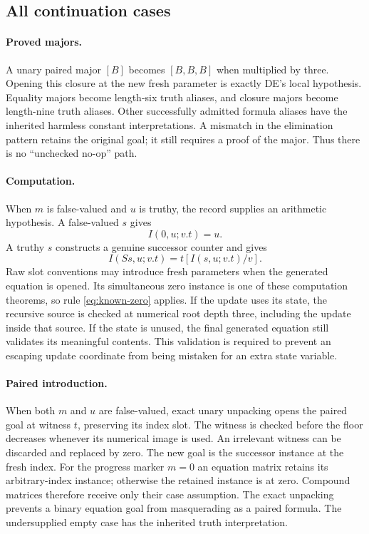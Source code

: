 \subsection{All continuation cases}

\paragraph{Proved majors.}
A unary paired major $[B]$ becomes $[B,B,B]$ when multiplied by three.
Opening this closure at the new fresh parameter is exactly DE's local
hypothesis. Equality majors become length-six truth aliases, and closure
majors become length-nine truth aliases. Other successfully admitted
formula aliases have the inherited harmless constant interpretations.
A mismatch in the elimination pattern retains the original goal; it
still requires a proof of the major. Thus there is no ``unchecked
no-op'' path.

\paragraph{Computation.}
When $m$ is false-valued and $u$ is truthy, the record supplies an
arithmetic hypothesis. A false-valued $s$ gives
\[
   I(0,u;v.t)=u.
\]
A truthy $s$ constructs a genuine successor counter and gives
\[
   I(Ss,u;v.t)=t[I(s,u;v.t)/v].
\]
Raw slot conventions may introduce fresh parameters when the generated
equation is opened. Its simultaneous zero instance is one of these
computation theorems, so rule \eqref{eq:known-zero} applies. If the update
uses its state, the recursive source is checked at numerical root depth
three, including the update inside that source. If the state is unused,
the final generated equation still validates its meaningful contents.
This validation is required to prevent an escaping update coordinate
from being mistaken for an extra state variable.

\paragraph{Paired introduction.}
When both $m$ and $u$ are false-valued, exact unary unpacking opens the
paired goal at witness $t$, preserving its index slot. The witness is
checked before the floor decreases whenever its numerical image is used.
An irrelevant witness can be discarded and replaced by zero.
The new goal is the successor
instance at the fresh index. For the progress marker $m=0$ an equation
matrix retains its arbitrary-index instance; otherwise the retained
instance is at zero. Compound matrices therefore receive only their
case assumption. The exact unpacking prevents a binary equation goal
from masquerading as a paired formula. The undersupplied empty case
has the inherited truth interpretation.

